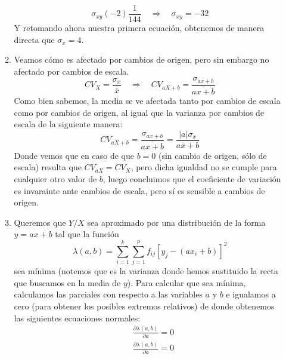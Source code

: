 \documentclass[fleqn]{article}
\def\next{\quad \Rightarrow \quad}
\begin{document}
\begin{enumerate}
\begin{enumerate}
$$                                        \sigma_{xy}(-2)\frac{1}{144} \next \sigma_{xy} = -32
                                        $$
                                        Y retomando ahora nuestra primera ecuación, obtenemos de manera directa que $\sigma_x = 4 $.\\
                                \item Veamos cómo es afectado por cambios de origen, pero sin embargo no afectado por cambios de escala.
                                        $$CV_X = \frac{\sigma_x}{\bar{x}}  \next  CV_{aX+b} = \frac{\sigma_{ax+b}}{\overline{{ax+b}}}$$
                                        Como bien sabemos, la media se ve afectada tanto por cambios de escala como por cambios de origen, 
                                        al igual que la varianza por cambios de escala de la siguiente manera:
                                        $$CV_{aX+b} = \frac{\sigma_{ax+b}}{\overline{{ax+b}}} = \frac{|a|\sigma_{x}}{a\overline{x} + b}$$
                                        Donde vemos que en caso de que $b=0$ (sin cambio de origen, sólo de escala) resulta que 
                                        $CV_{aX} = CV_{X}$, pero dicha igualdad no se cumple para cualquier otro valor de $b$, luego concluimos
                                        que el coeficiente de variación es invarainte ante cambios de escala, pero sí es sensible a cambios de origen.\\
                                \item Queremos que $Y/X$ sea aproximado por una distribución de la forma $y=ax+b$ tal que la función
                                        $$\lambda(a,b) = \sum_{i=1}^k \sum_{j=1}^p f_{ij} [y_j - (ax_i + b)]^2$$
                                        sea mínima (notemos que es la varianza donde hemos sustituido la recta que buscamos en la media de $y$). Para calcular 
                                        que sea mínima, calculamos las parciales con respecto a las variables $a$ y $b$ e igualamos a cero (para obtener los 
                                        posibles extremos relativos) de donde obtenemos las siguientes ecuaciones normales:
                                        $$
                                        \left.
                                        \begin{aligned}
                                                &\frac{\partial \lambda(a,b)}{\partial a} = 0 \\
                                                &\frac{\partial \lambda(a,b)}{\partial a} = 0 \\                                                

\end{aligned}$$
\end{enumerate}
\end{enumerate}
\end{document}

